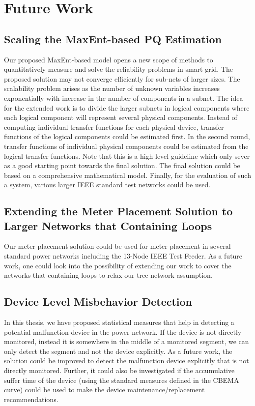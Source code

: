\documentclass[12pt,oneside]{book}
\begin{document}
\section{Future Work}
\subsection{Scaling the MaxEnt-based PQ Estimation}
Our proposed MaxEnt-based model opens a new scope of methods to quantitatively measure and solve the reliability problems in smart grid. The proposed solution may not converge efficiently for sub-nets of larger sizes. The scalability problem arises as the number of unknown variables increases exponentially with increase in the number of components in a subnet. The idea for the extended work is to divide the larger subnets in logical components where each logical component will represent several physical components. Instead of computing individual transfer functions for each physical device, transfer functions of the logical components could be estimated first. In the second round, transfer functions of individual physical components could be estimated from the logical transfer functions. Note that this is a high level guideline which only sever as a good starting point towards the final solution. The final solution could be based on a comprehensive mathematical model. Finally, for the evaluation of such a system, various larger IEEE standard test networks could be used.


\subsection{Extending the Meter Placement Solution to Larger Networks that Containing Loops}
Our meter placement solution could be used for meter placement in several standard power networks including the 13-Node IEEE Test Feeder. As a future work, one could look into the possibility of extending our work to cover the networks that containing loops to relax our tree network assumption.

\subsection{Device Level Misbehavior Detection}
In this thesis, we have proposed statistical measures that help in detecting a potential malfunction device in the power network. If the device is not directly monitored, instead it is somewhere in the middle of a monitored segment, we can only detect the segment and not the device explicitly. As a future work, the solution could be improved to detect the malfunction device explicitly that is not directly monitored. Further, it could also be investigated if the accumulative suffer time of the device (using the standard measures defined in the CBEMA curve) could be used to make the device maintenance/replacement recommendations.

\end{document}
